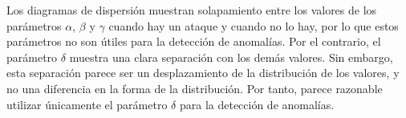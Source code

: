 Los diagramas de dispersión muestran solapamiento entre los valores de los parámetros $\alpha$, $\beta$ y $\gamma$ cuando hay un ataque y cuando no lo hay, por lo que estos parámetros no son útiles para la detección de anomalías. Por el contrario, el parámetro $\delta$ muestra una clara separación con los demás valores. Sin embargo, esta separación parece ser un desplazamiento de la distribución de los valores, y no una diferencia en la forma de la distribución. 
Por tanto, parece razonable utilizar únicamente el parámetro $\delta$ para la detección de anomalías.
